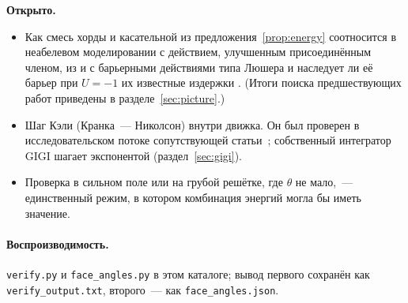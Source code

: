 \textbf{Открыто.}
\begin{itemize}
  \item Как смесь хорды и касательной из предложения~\ref{prop:energy} соотносится в неабелевом
    моделировании с действием, улучшенным присоединённым членом, из \cite{deforcrand} и с барьерными
    действиями типа Люшера \cite{luscher,fukaya} и наследует ли её барьер при $U=-1$ их известные
    издержки \cite{creutz}. (Итоги поиска предшествующих работ приведены в разделе~\ref{sec:picture}.)
  \item Шаг Кэли (Кранка~--- Николсон) внутри движка. Он был проверен в исследовательском
    потоке сопутствующей статьи~\cite{davis-rtc}; собственный интегратор GIGI шагает
    экспонентой (раздел~\ref{sec:gigi}).
  \item Проверка в сильном поле или на грубой решётке, где $\theta$ не мало,~--- единственный режим,
    в котором комбинация энергий могла бы иметь значение.
\end{itemize}

\paragraph{Воспроизводимость.} \texttt{verify.py} и \texttt{face\_angles.py} в этом
каталоге; вывод первого сохранён как \texttt{verify\_output.txt}, второго~--- как
\texttt{face\_angles.json}.

